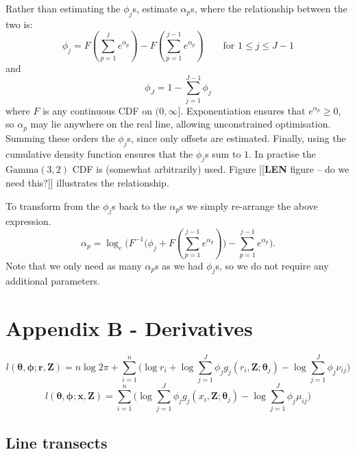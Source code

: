 \documentclass[useAMS,referee, usegraphicx]{biom}
\begin{document}
Rather than estimating the $\phi_j$s, estimate $\alpha_p$s, where the relationship between the two is:
\begin{equation*}
\phi_j = F(\sum_{p=1}^j e^{\alpha_p}) - F(\sum_{p=1}^{j-1} e^{\alpha_p}) \qquad \text{for } 1\leq j \leq J-1
\end{equation*}
and
\begin{equation*}
\phi_J = 1-\sum_{j=1}^{J-1} \phi_j
\end{equation*}
where $F$ is any continuous CDF on $(0,\infty]$. Exponentiation ensures that $e^{\alpha_p}\geq0$, so $\alpha_p$ may lie anywhere on the real line, allowing unconstrained optimisation. Summing these orders the $\phi_j$s, since only offsets are estimated. Finally, using the cumulative density function ensures that the $\phi_j$s sum to $1$. In practise the $\text{Gamma}(3,2)$ CDF is (somewhat arbitrarily) used. Figure [[\textbf{LEN} figure -- do we need this?]] illustrates the relationship.

To transform from the $\phi_j$s back to the $\alpha_p$s we simply re-arrange the above expression.
\begin{equation*}
\alpha_p = \log_e \Big(F^{-1}\Big(\phi_j + F(\sum_{p=1}^{j-1} e^{\alpha_p})\Big) - \sum_{p=1}^{j-1} e^{\alpha_p}\Big).
\end{equation*}
Note that we only need as many $\alpha_p$s as we had $\phi_j$s, so we do not require any additional parameters.

\section*{Appendix B - Derivatives}

\begin{equation}
l(\bm{\theta}, \bm{\phi}; \mathbf{r},\mathbf{Z}) = n \log 2 \pi + \sum_{i=1}^n \Big( \log r_i + \log \sum_{j=1}^J \phi_j g_j(r_i,\mathbf{Z}; \bm{\theta}_j) - \log \sum_{j=1}^J \phi_j \nu_{ij}\Big)
\label{pt-lik}
\end{equation}
\begin{equation}
l(\bm{\theta}, \bm{\phi}; \mathbf{x},\mathbf{Z}) = \sum_{i=1}^n \Big( \log \sum_{j=1}^J \phi_j g_j(x_i,\mathbf{Z}; \bm{\theta}_j) - \log \sum_{j=1}^J \phi_j \mu_{ij}\Big)
\label{lt-lik}
\end{equation}


\subsection*{Line transects}
\end{document}
